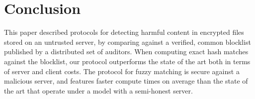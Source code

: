 \section{Conclusion}
%
This paper described protocols for detecting harmful content in encrypted files stored on an untrusted server, by comparing against a verified, common blocklist 
published by a distributed set of auditors. When computing exact hash matches against the blocklist, our protocol outperforms the state of the art both in terms of server and client costs. The protocol for fuzzy matching is secure against a malicious server, and features faster compute times on average than the state of the art that operate under a model with a semi-honest server. 